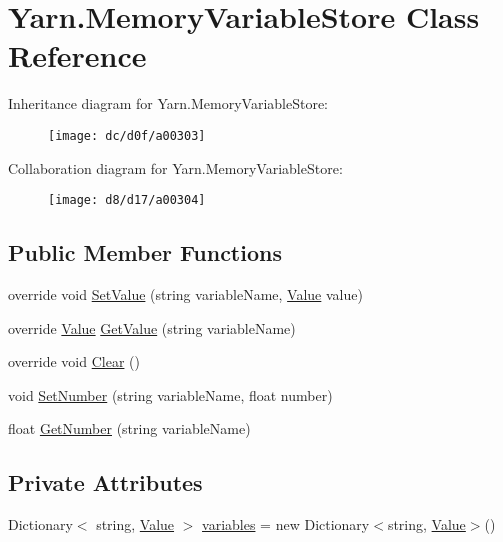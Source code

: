 \hypertarget{a00052}{\section{Yarn.\-Memory\-Variable\-Store Class Reference}
\label{a00052}
}


Inheritance diagram for Yarn.\-Memory\-Variable\-Store\-:
\nopagebreak
\begin{figure}[H]
\begin{center}
\leavevmode
\texttt{[image: dc/d0f/a00303]}
\end{center}
\end{figure}


Collaboration diagram for Yarn.\-Memory\-Variable\-Store\-:
\nopagebreak
\begin{figure}[H]
\begin{center}
\leavevmode
\texttt{[image: d8/d17/a00304]}
\end{center}
\end{figure}
\subsection*{Public Member Functions}
\begin{DoxyCompactItemize}
\item 
override void \hyperlink{a00052_a653a459811e5c19549f4b31269093ef5}{Set\-Value} (string variable\-Name, \hyperlink{a00086}{Value} value)
\item 
override \hyperlink{a00086}{Value} \hyperlink{a00052_a0ce77e8245c504a777540e359704aa2a}{Get\-Value} (string variable\-Name)
\item 
override void \hyperlink{a00052_aa6d243e7ef02b91f793a221f509dae69}{Clear} ()
\item 
void \hyperlink{a00021_a48b93de9cd7ae61d0cd9583c8330d3ee}{Set\-Number} (string variable\-Name, float number)
\item 
float \hyperlink{a00021_a1b7f7f4468b2463e7b47986d99362279}{Get\-Number} (string variable\-Name)
\end{DoxyCompactItemize}
\subsection*{Private Attributes}
\begin{DoxyCompactItemize}
\item 
Dictionary$<$ string, \hyperlink{a00086}{Value} $>$ \hyperlink{a00052_aad18acd95297edb8ed496857337f8071}{variables} = new Dictionary$<$string, \hyperlink{a00086}{Value}$>$()
\end{DoxyCompactItemize}


